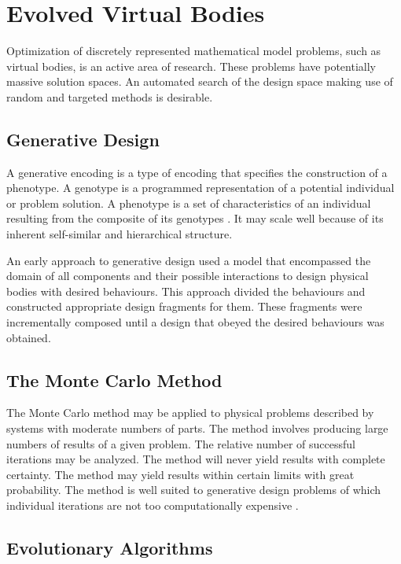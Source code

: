 \section{Evolved Virtual Bodies}

Optimization of discretely represented mathematical model problems, such as virtual bodies, is an active area of research. These problems have potentially massive solution spaces. An automated search of the design space making use of random and targeted methods is desirable.

\subsection{Generative Design}

A generative encoding is a type of encoding that specifies the construction of a phenotype. A genotype is a programmed representation of a potential individual or problem solution. A phenotype is a set of characteristics of an individual resulting from the composite of its genotypes \citep{Sims1994a}. It may scale well because of its inherent self-similar and hierarchical structure. \citep{Hornby2001b}

An early approach to generative design used a model that encompassed the domain of all components and their possible interactions to design physical bodies with desired behaviours. This approach divided the behaviours and constructed appropriate design fragments for them. These fragments were incrementally composed until a design that obeyed the desired behaviours was obtained. \citep{Brose1993} 

\subsection{The Monte Carlo Method}

The Monte Carlo method may be applied to physical problems described by systems with moderate numbers of parts. The method involves producing large numbers of results of a given problem. The relative number of successful iterations may be analyzed. The method will never yield results with complete certainty. The method may yield results within certain limits with great probability. The method is well suited to generative design problems of which individual iterations are not too computationally expensive \citep{Metropolis1949}.

\subsection{Evolutionary Algorithms}

